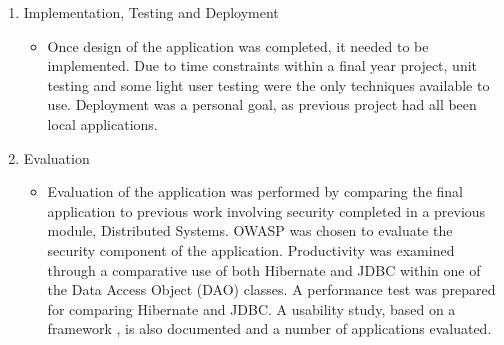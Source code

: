 \begin{enumerate}
\item Implementation, Testing and Deployment
\begin{itemize}
\item Once design of the application was completed, it needed to be implemented. Due to time constraints within a final year project, unit testing and some light user testing were the only techniques available to use. Deployment was a personal goal, as previous project had all been local applications.
\end{itemize}
\item Evaluation
\begin{itemize}
\item Evaluation of the application was performed by comparing the final application to previous work involving security completed in a previous module, Distributed Systems. OWASP was chosen to evaluate the security component of the application. Productivity was examined through a comparative use of both Hibernate and JDBC within one of the Data Access Object (DAO) classes. A performance test was prepared for comparing Hibernate and JDBC. A usability study, based on a framework \parencite{holzinger2005usability}, is also documented and a number of applications evaluated.
\end{itemize}
\end{enumerate}
